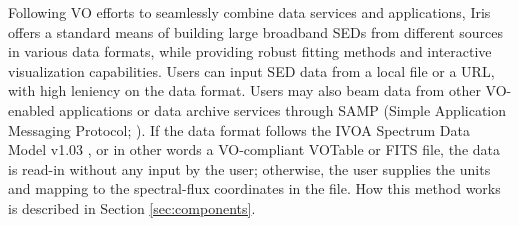\documentclass[5p]{elsarticle}
\begin{document}
Following VO efforts to seamlessly combine data services and applications, Iris offers a standard means of building large broadband SEDs from different sources in various data formats, while providing robust fitting methods and interactive visualization capabilities. Users can input SED data from a local file or a URL, with high leniency on the data format. Users may also beam data from other VO-enabled applications or data archive services through SAMP (Simple Application Messaging Protocol; \citep{2011arXiv1110.0528T}). If the data format follows the IVOA Spectrum Data Model v1.03 \citep{2012arXiv1204.3055M}, or in other words a VO-compliant VOTable or FITS file, the data is read-in without any input by the user; otherwise, the user supplies the units and mapping to the spectral-flux coordinates in the file. How this method works is described in Section \ref{sec:components}.



\end{document}
